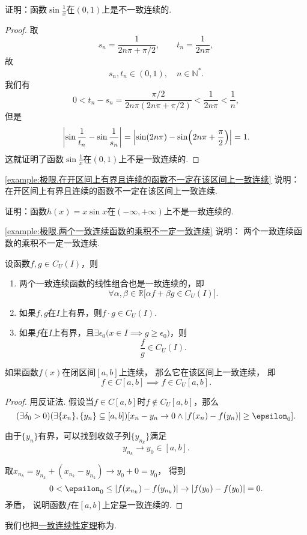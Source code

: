 \begin{example}\label{example:极限.在开区间上有界且连续的函数不一定在该区间上一致连续}
证明：函数\(\sin\frac{1}{x}\)在\((0,1)\)上是不一致连续的.
\begin{proof}
取\[
s_n = \frac{1}{2n\pi+\pi/2},
\qquad
t_n = \frac{1}{2n\pi},
\]故\[
s_n,t_n\in(0,1),
\quad n\in\mathbb{N}^*.
\]我们有\[
0 < t_n - s_n = \frac{\pi/2}{2n\pi(2n\pi+\pi/2)} < \frac{1}{2n\pi} < \frac{1}{n},
\]但是\[
\abs{\sin\frac{1}{t_n} - \sin\frac{1}{s_n}}
= \abs{\sin(2n\pi) - \sin(2n\pi+\frac{\pi}{2})}
= 1.
\]这就证明了函数\(\sin\frac{1}{x}\)在\((0,1)\)上不是一致连续的.
\end{proof}
\end{example}
\cref{example:极限.在开区间上有界且连续的函数不一定在该区间上一致连续} 说明：
在开区间上有界且连续的函数不一定在该区间上一致连续.

\begin{example}\label{example:极限.两个一致连续函数的乘积不一定一致连续}
证明：函数\(h(x) = x \sin x\)在\((-\infty,+\infty)\)上不是一致连续的.
\end{example}
\cref{example:极限.两个一致连续函数的乘积不一定一致连续} 说明：
两个一致连续函数的乘积不一定一致连续.

\begin{theorem}[一致连续函数的四则运算法则]\label{theorem:极限.闭区间上连续函数的性质.一致连续函数的四则运算法则}
设函数\(f,g \in C_U(I)\)，则
\begin{enumerate}
\item 两个一致连续函数的线性组合也是一致连续的，即\[
\forall\alpha,\beta\in\mathbb{R} \bigl[ \alpha f + \beta g \in C_U(I) \bigr].
\]

\item 如果\(f,g\)在\(I\)上有界，则\(f \cdot g \in C_U(I)\).

\item 如果\(f\)在\(I\)上有界，且\(\exists\epsilon_0 \bigl( x \in I \implies g \geq \epsilon_0 \bigr)\)，则\[
\frac{f}{g} \in C_U(I).
\]
\end{enumerate}
\end{theorem}

\begin{theorem}[一致连续性定理]\label{theorem:极限.一致连续性定理}
如果函数\(f(x)\)在闭区间\([a,b]\)上连续，
那么它在该区间上一致连续，
即\[
	f \in C[a,b]
	\implies
	f \in C_U[a,b].
\]
\begin{proof}
用反证法.
假设当\(f \in C[a,b]\)时\(f \notin C_U[a,b]\)，那么\[
	(\exists\delta_0>0)
	(\exists\{x_n\},\{y_n\}\subseteq[a,b])
	[
		x_n-y_n\to0
		\land
		\abs{f(x_n)-f(y_n)}\geq\epsilon_0
	].
\]

由于\(\{y_n\}\)有界，可以找到收敛子列\(\{y_{n_k}\}\)满足\[
	y_{n_k} \to y_0\in[a,b].
\]

取\(x_{n_k} = y_{n_k} + (x_{n_k} - y_{n_k})
\to y_0 + 0 = y_0\)，
得到\[
	0 < \epsilon_0 \leq \abs{f(x_{n_k})-f(y_{n_k})}
	\to \abs{f(y_0)-f(y_0)} = 0.
\]矛盾，
说明函数\(f\)在\([a,b]\)上定是一致连续的.
\end{proof}
\end{theorem}
我们也把\hyperref[theorem:极限.一致连续性定理]{一致连续性定理}称为.

